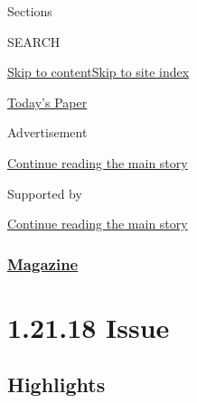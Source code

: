 Sections

SEARCH

\protect\hyperlink{site-content}{Skip to
content}\protect\hyperlink{site-index}{Skip to site index}

\href{https://myaccount.nytimes3xbfgragh.onion/auth/login?response_type=cookie\&client_id=vi}{}

\href{https://www.nytimes3xbfgragh.onion/section/todayspaper}{Today's
Paper}

Advertisement

\protect\hyperlink{after-top}{Continue reading the main story}

Supported by

\protect\hyperlink{after-sponsor}{Continue reading the main story}

\hypertarget{magazine}{%
\subsubsection{\texorpdfstring{\href{/section/magazine}{Magazine}}{Magazine}}\label{magazine}}

\hypertarget{12118-issue}{%
\section{1.21.18 Issue}\label{12118-issue}}

\hypertarget{highlights}{%
\subsection{Highlights}\label{highlights}}

